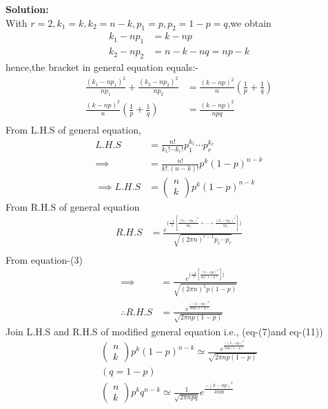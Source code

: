 \documentclass[journal,twocolumn]{IEEEtran}
\newcommand{\myvec}[1]{\ensuremath{\begin{pmatrix}#1\end{pmatrix}}}
\begin{document}
\begin{Large}
{\LARGE \textbf{Solution:\\}}
With $r = 2,k_{1} = k,k_{2} = n-k,p_{1} = p,p_{2} = 1-p = q$,we obtain  \\
\begin{align}
k_{1} - np_{1} &= k-np  \\
k_{2} -np_{2} &= n-k-nq = np-k 
\end{align}
hence,the bracket in general equation equals:-\\
\begin{align}\frac{(k_{1}-np_{1})^{2}}{np_{1}}+\frac{(k_{2}-np_{2})^{2}}{np_{2}} &= \frac{(k-np)^{2}}{n}(\frac{1}{p}+\frac{1}{q})\\
\frac{(k-np)^{2}}{n}(\frac{1}{p}+\frac{1}{q}) &= \frac{(k-np)^{2}}{npq}\\
\end{align}
From L.H.S of general equation,\\
\begin{align}
L.H.S &=\frac{n!}{k_{1}! \cdots k_{r}!}p_{1}^{k_{1}} \cdots p_{r}^{k_{r}}\\
\implies &= \frac{n!}{k!.(n-k)!}p^{k}(1-p)^{n-k}\\
\implies L.H.S&=\myvec{n \\ k}p^{k}(1-p)^{n-k}
\end{align}
From R.H.S of general equation\\
\begin{align}
R.H.S &= \frac{e^{\{\frac{-1}{2}[\frac{(k_{1}-np_{1})^{2}}{np_{1}}+ \cdots +\frac{(k_{r}-np_{r})^{2}}{np_{r}}]\}}}{\sqrt{(2\pi n)^{r-1}p_{1}\cdots p_{r} }}\\
\end{align}
From equation-(3)\\
\begin{align}
\implies &=\frac{e^{\{\frac{-1}{2}[\frac{(k-np)^{2}}{np(1-p)}]\}}}{\sqrt{(2\pi n)^{1}p(1-p)}}\\
\therefore R.H.S &= \frac{e^{\frac{-(k-np)^{2}}{2np(1-p)}}}{\sqrt{2\pi np(1-p)}}
\end{align}
Join L.H.S and R.H.S of modified general equation i.e., (eq-(7)and eq-(11))\\
\begin{align}
\myvec{n \\ k}p^{k}(1-p)^{n-k} \simeq \frac{e^{\frac{-(k-n p)^{2}}{2np(1-p)}}}{\sqrt{2\pi np(1-p)}}\\
(q = 1-p) \\
\myvec{n \\ k}p^{k}q^{n-k}  \simeq \frac{1}{\sqrt{2\pi npq}}e^{\frac{-(k-np)^{2}}{2npq}}
\end{align}
\end{Large}
\end{document}
